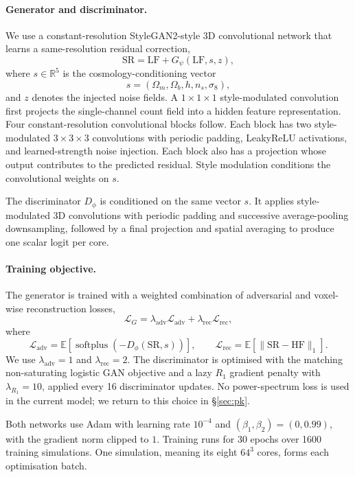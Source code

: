 \documentclass{article} %
\begin{document}
\paragraph{Generator and discriminator.}
We use a constant-resolution StyleGAN2-style 3D convolutional network that learns
a same-resolution residual correction,
\[
    \mathrm{SR} = \mathrm{LF} + G_\psi(\mathrm{LF},s,z),
\]
where $s\in\mathbb{R}^5$ is the cosmology-conditioning vector
\[
    s=(\Omega_m,\Omega_b,h,n_s,\sigma_8),
\]
and $z$ denotes the injected noise fields. A $1\times1\times1$ style-modulated
convolution first projects the single-channel count field into a hidden feature
representation. Four constant-resolution convolutional blocks follow. Each block
has two style-modulated $3\times3\times3$ convolutions with periodic padding,
LeakyReLU activations, and learned-strength noise injection. Each block also has a
projection whose output contributes to the predicted residual. Style modulation
conditions the convolutional weights on $s$.

The discriminator $D_\phi$ is conditioned on the same vector $s$. It applies
style-modulated 3D convolutions with periodic padding and successive
average-pooling downsampling, followed by a final projection and spatial averaging
to produce one scalar logit per core.

\paragraph{Training objective.}
The generator is trained with a weighted combination of adversarial and voxel-wise
reconstruction losses,
\[
    \mathcal{L}_G
    =
    \lambda_{\mathrm{adv}}\mathcal{L}_{\mathrm{adv}}
    +
    \lambda_{\mathrm{rec}}\mathcal{L}_{\mathrm{rec}},
\]
where
\[
    \mathcal{L}_{\mathrm{adv}}
    =
    \mathbb{E}\!\left[
        \operatorname{softplus}\!\left(-D_\phi(\mathrm{SR},s)\right)
    \right],
    \qquad
    \mathcal{L}_{\mathrm{rec}}
    =
    \mathbb{E}\!\left[
        \|\mathrm{SR}-\mathrm{HF}\|_1
    \right].
\]
We use $\lambda_{\mathrm{adv}}=1$ and $\lambda_{\mathrm{rec}}=2$. The discriminator
is optimised with the matching non-saturating logistic GAN objective and a lazy
$R_1$ gradient penalty with $\lambda_{R_1}=10$, applied every 16 discriminator
updates. No power-spectrum loss is used in the current model; we return to this
choice in \S\ref{sec:pk}.

Both networks use Adam with learning rate $10^{-4}$ and
$(\beta_1,\beta_2)=(0,0.99)$, with the gradient norm clipped to $1$. Training runs
for 30 epochs over 1600 training simulations. One simulation, meaning its eight
$64^3$ cores, forms each optimisation batch.
\end{document}
